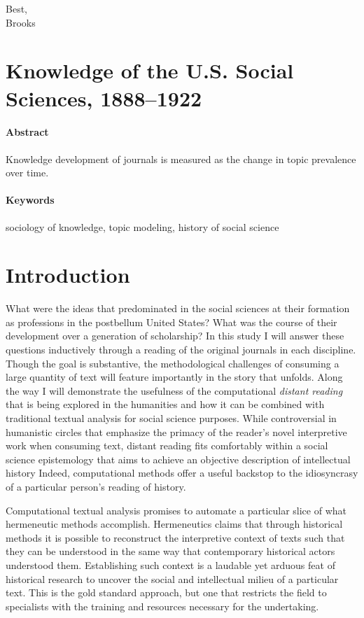 \documentclass[]{book}
\begin{document}
Best,\\
Brooks




\chapter*{Knowledge of the U.S. Social Sciences, 1888--1922}\label{kd}

\subsubsection*{Abstract}\label{abstract}


Knowledge development of journals is measured as the change
in topic prevalence over time.

\subsubsection*{Keywords}\label{keywords}


sociology of knowledge, topic modeling, history of social science

\chapter{Introduction}\label{kd-intro}

What were the ideas that predominated in the social sciences at their
formation as professions in the postbellum United States? What was the
course of their development over a generation of scholarship? In this
study I will answer these questions inductively through a reading of the
original journals in each discipline. Though the goal is substantive,
the methodological challenges of consuming a large quantity of text will
feature importantly in the story that unfolds. Along the way I will
demonstrate the usefulness of the computational \emph{distant reading}
that is being explored in the humanities and how it can be combined with
traditional textual analysis for social science purposes. While
controversial in humanistic circles that emphasize the primacy of the
reader's novel interpretive work when consuming text, distant reading
fits comfortably within a social science epistemology that aims to
achieve an objective description of intellectual history Indeed,
computational methods offer a useful backstop to the idiosyncrasy of a
particular person's reading of history.

Computational textual analysis promises to automate a particular slice
of what hermeneutic methods accomplish. Hermeneutics claims that through
historical methods it is possible to reconstruct the interpretive
context of texts such that they can be understood in the same way that
contemporary historical actors understood them. Establishing such
context is a laudable yet arduous feat of historical research to uncover
the social and intellectual milieu of a particular text. This is the
gold standard approach, but one that restricts the field to specialists
with the training and resources necessary for the undertaking.
\end{document}
